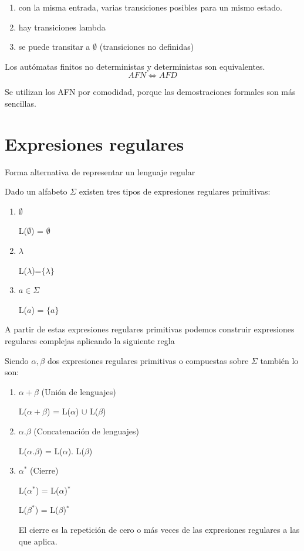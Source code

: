 \documentclass{apuntes}
\begin{document}
\begin{defn}
\begin{enumerate}
\item con la misma entrada, varias transiciones posibles para un mismo estado.
\item hay transiciones lambda
\item se puede transitar a $\emptyset$ (transiciones no definidas)
\end{enumerate}
\end{defn}

\begin{theorem}
Los autómatas finitos no deterministas y deterministas son equivalentes.
\[ AFN \iff AFD \]
\end{theorem}
Se utilizan los AFN por comodidad, porque las demostraciones formales son más sencillas.


\chapter{Expresiones regulares}

\begin{defn}
Forma alternativa de representar un lenguaje regular
\end{defn}

Dado un alfabeto $\Sigma$ existen tres tipos de expresiones regulares primitivas:
\begin{enumerate}
\item $\emptyset$ 

L($\emptyset$) = $\emptyset$
\item $\lambda$

 L($\lambda$)=$\lbrace \lambda \rbrace$
\item $a\in \Sigma$ 

L($a$) = $\lbrace a \rbrace$
\end{enumerate}

A partir de estas expresiones regulares primitivas podemos construir expresiones regulares complejas aplicando la siguiente regla

Siendo $\alpha, \beta$ dos expresiones regulares primitivas o compuestas sobre $\Sigma$ también lo son:
\begin{enumerate}
\item $\alpha + \beta$ (Unión de lenguajes)

L($\alpha + \beta$) = L($\alpha $) $\cup$ L($\beta$)
\item $\alpha . \beta$ (Concatenación de lenguajes)

L($\alpha . \beta$) = L($\alpha $). L($\beta$)
\item $\alpha^*$ (Cierre)

L($\alpha^*$) = L($\alpha$)$^*$

L($\beta^*$) = L($\beta$)$^*$

El cierre es la repetición de cero o más veces de las expresiones regulares a las que aplica.
\end{enumerate}
\end{document}
